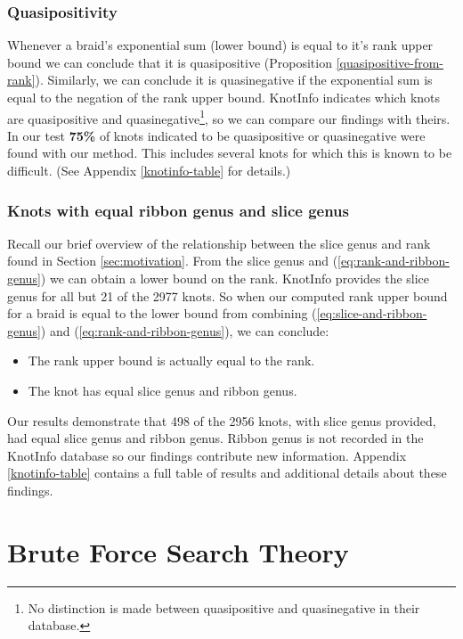 \documentclass[12pt]{thesis}
\begin{document}
\subsection{Quasipositivity}

Whenever a braid's exponential sum (lower bound) is equal to it's rank upper bound 
we can conclude that it is quasipositive (Proposition \ref{quasipositive-from-rank}).
Similarly, we can conclude it is quasinegative if the exponential sum is equal to the negation of the rank upper bound.
KnotInfo indicates which knots are quasipositive and quasinegative\footnote{No distinction is made between quasipositive and quasinegative in their database.}, so we can compare our findings with theirs.
In our test \textbf{75\%} of knots indicated to be quasipositive or quasinegative were found with our method.
This includes several knots for which this is known to be difficult.
(See Appendix \ref{knotinfo-table} for details.)

\subsection{Knots with equal ribbon genus and slice genus}

Recall our brief overview of the relationship between
the slice genus and rank found in Section \ref{sec:motivation}.
From the slice genus and (\ref{eq:rank-and-ribbon-genus})
we can obtain a lower bound on the rank.
KnotInfo provides the slice genus for all
but 21 of the 2977 knots.
So when our computed rank upper bound for a braid is equal to the lower bound
from combining (\ref{eq:slice-and-ribbon-genus}) and (\ref{eq:rank-and-ribbon-genus}), we can conclude:
\begin{itemize}
    \item The rank upper bound is actually equal to the rank.
    \item The knot has equal slice genus and ribbon genus.
\end{itemize}

Our results demonstrate that 498 of the 2956 knots, with slice genus provided,
had equal slice genus and ribbon genus.
Ribbon genus is not recorded in the KnotInfo database
so our findings contribute new information.
Appendix \ref{knotinfo-table} contains a full table of results and
 additional details about these findings.

\chapter{Brute Force Search Theory}
\end{document}
